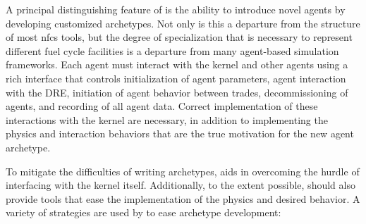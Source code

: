 A principal distinguishing feature of \Cyclus is the ability to introduce
novel agents by developing customized archetypes.  Not only is this a
departure from the structure of most \gls{nfcs} tools, but
the degree of specialization that is necessary to represent different fuel
cycle facilities is a departure from many agent-based simulation frameworks.
Each agent must interact with the \Cyclus kernel and other agents using a rich
interface that controls initialization of agent parameters, agent interaction
with the \gls{DRE}, initiation of agent behavior between trades,
decommissioning of agents, and recording of all agent data.  Correct
implementation of these interactions with the kernel are necessary, in
addition to implementing the physics and interaction behaviors that are the
true motivation for the new agent archetype.

To mitigate the difficulties of writing archetypes, \Cyclus aids in overcoming
the hurdle of interfacing with the kernel itself. Additionally, to the extent
possible, \Cyclus should also provide tools that ease the implementation of
the physics and desired behavior.  A variety of strategies are used by \Cyclus
to ease archetype development:

